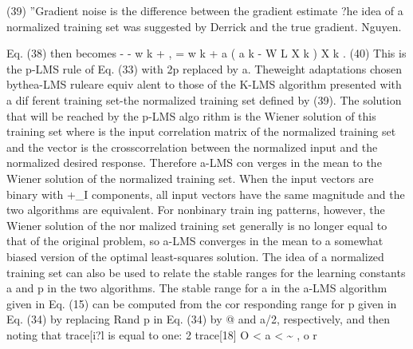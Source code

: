 \documentclass[11pt,a4paper,twocolumn]{article}
\begin{document}
{(39) 
”Gradient noise is the difference between the gradient estimate 
?he idea of a normalized training set was suggested by Derrick 
and the true gradient. 
Nguyen. 






\newpage


Eq. (38) then becomes 
- -  
w k + ,  = w k  + a ( a k  - W L X k ) X k .  
(40) 
This is the p-LMS rule of Eq. (33) with 2p replaced by a. 
Theweight adaptations chosen bythea-LMS ruleare equiv
alent to those of the K-LMS algorithm presented with a dif
ferent training set-the normalized training set defined by 
(39). The solution that will be reached by the p-LMS algo
rithm is the Wiener solution of this training set 
where 
is the input correlation matrix of the normalized training 
set and the vector 
is the crosscorrelation between the normalized input and 
the normalized desired response. Therefore a-LMS con
verges in the mean to the Wiener solution of the normalized 
training set. When the input vectors are binary with +\_I 
components, all input vectors have the same magnitude 
and the two algorithms are equivalent. For nonbinary train
ing patterns, however, the Wiener solution of the nor
malized training set generally is no longer equal to that of 
the original problem, so a-LMS converges in the mean to 
a somewhat biased version of the optimal least-squares 
solution. 
The idea of a normalized training set can also be used to 
relate the stable ranges for the learning constants a and p 
in the two algorithms. The stable range for a in the a-LMS 
algorithm given in Eq. (15) can be computed from the cor
responding range for p given in Eq. (34) by replacing Rand 
p in Eq. (34) by @ and a/2, respectively, and then noting that 
trace[i?l is equal to one: 
2 
trace[18] 
O
<
a
<
\~{}
,
o
r

}
\end{document}

